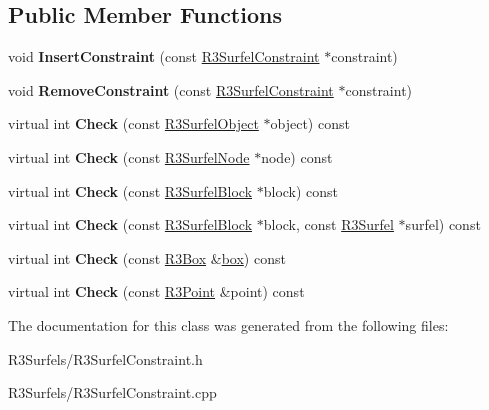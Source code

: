 \subsection*{Public Member Functions}
\begin{DoxyCompactItemize}
\item 
void {\bfseries Insert\+Constraint} (const \hyperlink{class_r3_surfel_constraint}{R3\+Surfel\+Constraint} $\ast$constraint)\hypertarget{class_r3_surfel_multi_constraint_a3d5ef6ca763be09bf0d56a9abb7b273c}{}\label{class_r3_surfel_multi_constraint_a3d5ef6ca763be09bf0d56a9abb7b273c}

\item 
void {\bfseries Remove\+Constraint} (const \hyperlink{class_r3_surfel_constraint}{R3\+Surfel\+Constraint} $\ast$constraint)\hypertarget{class_r3_surfel_multi_constraint_ae770e62a164e8f2b05e0426602fafcd8}{}\label{class_r3_surfel_multi_constraint_ae770e62a164e8f2b05e0426602fafcd8}

\item 
virtual int {\bfseries Check} (const \hyperlink{class_r3_surfel_object}{R3\+Surfel\+Object} $\ast$object) const \hypertarget{class_r3_surfel_multi_constraint_a0e63ecd36cdb630e5d6344bb5b828772}{}\label{class_r3_surfel_multi_constraint_a0e63ecd36cdb630e5d6344bb5b828772}

\item 
virtual int {\bfseries Check} (const \hyperlink{class_r3_surfel_node}{R3\+Surfel\+Node} $\ast$node) const \hypertarget{class_r3_surfel_multi_constraint_a7cb74059169c48d07e2eae38efea7d27}{}\label{class_r3_surfel_multi_constraint_a7cb74059169c48d07e2eae38efea7d27}

\item 
virtual int {\bfseries Check} (const \hyperlink{class_r3_surfel_block}{R3\+Surfel\+Block} $\ast$block) const \hypertarget{class_r3_surfel_multi_constraint_a7746059fedbc42ae85bda0559ea3c006}{}\label{class_r3_surfel_multi_constraint_a7746059fedbc42ae85bda0559ea3c006}

\item 
virtual int {\bfseries Check} (const \hyperlink{class_r3_surfel_block}{R3\+Surfel\+Block} $\ast$block, const \hyperlink{class_r3_surfel}{R3\+Surfel} $\ast$surfel) const \hypertarget{class_r3_surfel_multi_constraint_a5a451774cee42a9d409db6e1f6061aca}{}\label{class_r3_surfel_multi_constraint_a5a451774cee42a9d409db6e1f6061aca}

\item 
virtual int {\bfseries Check} (const \hyperlink{class_r3_box}{R3\+Box} \&\hyperlink{structbox}{box}) const \hypertarget{class_r3_surfel_multi_constraint_aea89a3a6867d06287331722b27a8d3b6}{}\label{class_r3_surfel_multi_constraint_aea89a3a6867d06287331722b27a8d3b6}

\item 
virtual int {\bfseries Check} (const \hyperlink{class_r3_point}{R3\+Point} \&point) const \hypertarget{class_r3_surfel_multi_constraint_a3ed679ce14135b3424c6de548be8ef39}{}\label{class_r3_surfel_multi_constraint_a3ed679ce14135b3424c6de548be8ef39}

\end{DoxyCompactItemize}


The documentation for this class was generated from the following files\+:\begin{DoxyCompactItemize}
\item 
R3\+Surfels/R3\+Surfel\+Constraint.\+h\item 
R3\+Surfels/R3\+Surfel\+Constraint.\+cpp\end{DoxyCompactItemize}
